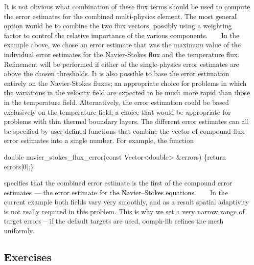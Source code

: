 \begin{DoxyItemize}
\begin{DoxyItemize}
\end{DoxyItemize}It is not obvious what combination of these flux terms should be used to compute the error estimates for the combined multi-\/physics element. The most general option would be to combine the two flux vectors, possibly using a weighting factor to control the relative importance of the various components. ~\newline
~\newline
 In the example above, we chose an error estimate that was the maximum value of the individual error estimates for the Navier-\/\+Stokes flux and the temperature flux. Refinement will be performed if either of the single-\/physics error estimates are above the chosen thresholds. It is also possible to base the error estimation entirely on the Navier-\/\+Stokes fluxes; an appropriate choice for problems in which the variations in the velocity field are expected to be much more rapid than those in the temperature field. Alternatively, the error estimation could be based exclusively on the temperature field; a choice that would be appropriate for problems with thin thermal boundary layers. The different error estimates can all be specified by user-\/defined functions that combine the vector of compound-\/flux error estimates into a single number. For example, the function 
\begin{DoxyCode}
\textcolor{keywordtype}{double} navier\_stokes\_flux\_error(\textcolor{keyword}{const} Vector<double> &errors)
 \{\textcolor{keywordflow}{return} errors[0];\}
\end{DoxyCode}
 specifies that the combined error estimate is the first of the compound error estimates --- the error estimate for the Navier--Stokes equations. ~\newline
~\newline
 In the current example both fields vary very smoothly, and as a result spatial adaptivity is not really required in this problem. This is why we set a very narrow range of target errors -- if the default targets are used, {\ttfamily oomph-\/lib} refines the mesh uniformly.
\end{DoxyItemize}\hypertarget{index_exercises}{}\subsection{Exercises}\label{index_exercises}

